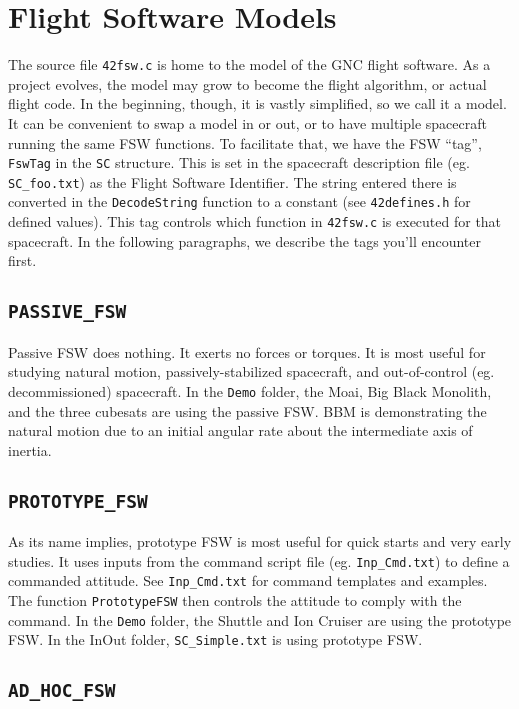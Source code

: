 \documentclass[12pt]{article}
\begin{document}
\section{Flight Software Models}

The source file {\tt 42fsw.c} is home to the model of the GNC flight software.  As a project evolves, the model may grow to become the flight algorithm, or actual flight code.  In the beginning, though, it is vastly simplified, so we call it a model.  It can be convenient to swap a model in or out, or to have multiple spacecraft running the same FSW functions.  To facilitate that, we have the FSW ``tag'', {\tt FswTag} in the {\tt SC} structure.  This is set in the spacecraft description file (eg. {\tt SC\_foo.txt}) as the Flight Software Identifier.   The string entered there is converted in the {\tt DecodeString} function to a constant (see {\tt 42defines.h} for defined values).  This tag controls which function in {\tt 42fsw.c} is executed for that spacecraft.  In the following paragraphs, we describe the tags you'll encounter first.

\subsection{\tt PASSIVE\_FSW}

Passive FSW does nothing.  It exerts no forces or torques.  It is most useful for studying natural motion, passively-stabilized spacecraft, and out-of-control (eg. decommissioned) spacecraft.  In the {\tt Demo} folder, the Moai, Big Black Monolith, and the three cubesats are using the passive FSW.  BBM is demonstrating the natural motion due to an initial angular rate about the intermediate axis of inertia.

\subsection{\tt PROTOTYPE\_FSW}

As its name implies, prototype FSW is most useful for quick starts and very early studies.  It uses inputs from the command script file (eg. {\tt Inp\_Cmd.txt}) to define a commanded attitude.  See {\tt Inp\_Cmd.txt} for command templates and examples.  The function {\tt PrototypeFSW} then controls the attitude to comply with the command.  In the {\tt Demo} folder, the Shuttle and Ion Cruiser are using the prototype FSW.  In the InOut folder, {\tt SC\_Simple.txt} is using prototype FSW.

\subsection{\tt AD\_HOC\_FSW}
\end{document}
